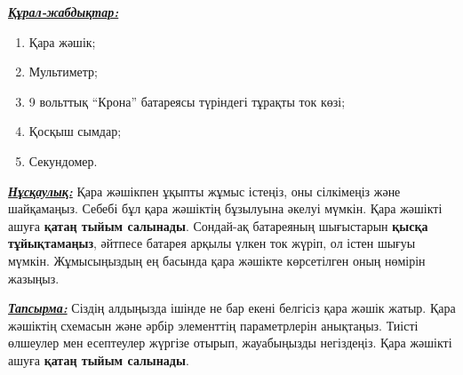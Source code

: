 \problemsheader


\textbf{\uline{\textit{Құрал-жабдықтар:}}}

\vspace*{6pt}

\begin{enumerate}[label=\textbf{\arabic*.}]
    \item Қара жәшік;
    \item Мультиметр;
    \item 9 вольттық ``Крона'' батареясы түріндегі тұрақты ток көзі;
    \item Қосқыш сымдар;
    \item Секундомер.
\end{enumerate}

\vspace{10pt}

\textbf{\uline{\textit{Нұсқаулық:}}} Қара жәшікпен ұқыпты жұмыс істеңіз, оны сілкімеңіз және шайқамаңыз. Себебі бұл қара жәшіктің бұзылуына әкелуі мүмкін. Қара жәшікті ашуға \textbf{қатаң тыйым салынады}. Сондай-ақ батареяның шығыстарын \textbf{қысқа тұйықтамаңыз}, әйтпесе батарея арқылы үлкен ток жүріп, ол істен шығуы мүмкін. Жұмысыңыздың ең басында қара жәшікте көрсетілген оның нөмірін жазыңыз.

\vspace{10pt}

\textbf{\uline{\textit{Тапсырма:}}} Сіздің алдыңызда ішінде не бар екені белгісіз қара жәшік жатыр. Қара жәшіктің схемасын және әрбір элементтің параметрлерін анықтаңыз. Тиісті өлшеулер мен есептеулер жүргізе отырып, жауабыңызды негіздеңіз. Қара жәшікті ашуға \textbf{қатаң тыйым салынады}.